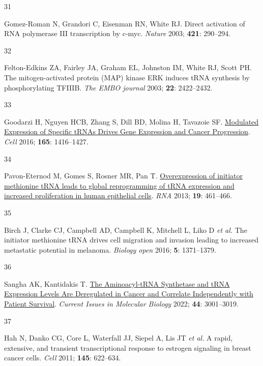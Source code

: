 \documentclass[
  12pt,
]{article}
\newlength{\cslhangindent}
\newlength{\csllabelwidth}
\newlength{\cslentryspacingunit} %
\newenvironment{CSLReferences}[2] %
 {%
  \setlength{\parindent}{0pt}
  \ifodd #1
  \let\oldpar\par
  \def\par{\hangindent=\cslhangindent\oldpar}
  \fi
  \setlength{\parskip}{#2\cslentryspacingunit}
 }%
 {}
\newcommand{\CSLLeftMargin}[1]{\parbox[t]{\csllabelwidth}{#1}}
\newcommand{\CSLRightInline}[1]{\parbox[t]{\linewidth - \csllabelwidth}{#1}\break}
\begin{document}
\begin{CSLReferences}{0}{0}
\leavevmode{}%
\CSLLeftMargin{31 }%
\CSLRightInline{Gomez-Roman N, Grandori C, Eisenman RN, White RJ. Direct activation of {RNA} polymerase {III} transcription by c-myc. \emph{Nature} 2003; \textbf{421}: 290--294.}

\leavevmode{}%
\CSLLeftMargin{32 }%
\CSLRightInline{Felton-Edkins ZA, Fairley JA, Graham EL, Johnston IM, White RJ, Scott PH. The mitogen-activated protein ({MAP}) kinase {ERK} induces {tRNA} synthesis by phosphorylating {TFIIIB}. \emph{The EMBO journal} 2003; \textbf{22}: 2422--2432.}

\leavevmode{}%
\CSLLeftMargin{33 }%
\CSLRightInline{Goodarzi H, Nguyen HCB, Zhang S, Dill BD, Molina H, Tavazoie SF. \href{https://doi.org/10.1016/j.cell.2016.05.046}{Modulated Expression of Specific tRNAs Drives Gene Expression and Cancer Progression}. \emph{Cell} 2016; \textbf{165}: 1416--1427.}

\leavevmode{}%
\CSLLeftMargin{34 }%
\CSLRightInline{Pavon-Eternod M, Gomes S, Rosner MR, Pan T. \href{https://doi.org/10.1261/rna.037507.112}{Overexpression of initiator methionine tRNA leads to global reprogramming of tRNA expression and increased proliferation in human epithelial cells}. \emph{RNA} 2013; \textbf{19}: 461--466.}

\leavevmode{}%
\CSLLeftMargin{35 }%
\CSLRightInline{Birch J, Clarke CJ, Campbell AD, Campbell K, Mitchell L, Liko D \emph{et al.} The initiator methionine {tRNA} drives cell migration and invasion leading to increased metastatic potential in melanoma. \emph{Biology open} 2016; \textbf{5}: 1371--1379.}

\leavevmode{}%
\CSLLeftMargin{36 }%
\CSLRightInline{Sangha AK, Kantidakis T. \href{https://doi.org/10.3390/cimb44070207}{The Aminoacyl-tRNA Synthetase and tRNA Expression Levels Are Deregulated in Cancer and Correlate Independently with Patient Survival}. \emph{Current Issues in Molecular Biology} 2022; \textbf{44}: 3001--3019.}

\leavevmode{}%
\CSLLeftMargin{37 }%
\CSLRightInline{Hah N, Danko CG, Core L, Waterfall JJ, Siepel A, Lis JT \emph{et al.} A rapid, extensive, and transient transcriptional response to estrogen signaling in breast cancer cells. \emph{Cell} 2011; \textbf{145}: 622--634.}


\end{CSLReferences}
\end{document}
